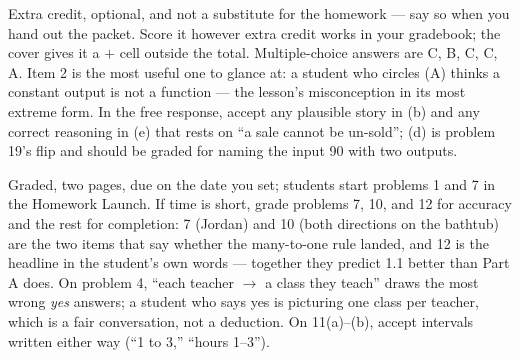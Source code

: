 \documentclass[10pt]{article}
\begin{document}
\begin{teachernote}[AP Practice]
Extra credit, optional, and not a substitute for the homework --- say so when you
hand out the packet. Score it however extra credit works in your gradebook; the
cover gives it a $+$ cell outside the total. Multiple-choice answers are C, B, C, C,
A. Item 2 is the most useful one to glance at: a student who circles (A) thinks a
constant output is not a function --- the lesson's misconception in its most
extreme form. In the free response, accept any plausible story in (b) and any
correct reasoning in (e) that rests on ``a sale cannot be un-sold''; (d) is problem
19's flip and should be graded for naming the input 90 with two outputs.
\end{teachernote}

\begin{teachernote}[Homework]
Graded, two pages, due on the date you set; students start problems 1 and 7 in the
Homework Launch. If time is short, grade problems 7, 10, and 12 for accuracy and
the rest for completion: 7 (Jordan) and 10 (both directions on the bathtub) are the
two items that say whether the many-to-one rule landed, and 12 is the headline in
the student's own words --- together they predict 1.1 better than Part A does. On
problem 4, ``each teacher $\to$ a class they teach'' draws the most wrong
\textit{yes} answers; a student who says yes is picturing one class per teacher,
which is a fair conversation, not a deduction. On 11(a)--(b), accept intervals
written either way (``1 to 3,'' ``hours 1--3'').
\end{teachernote}
\end{document}
